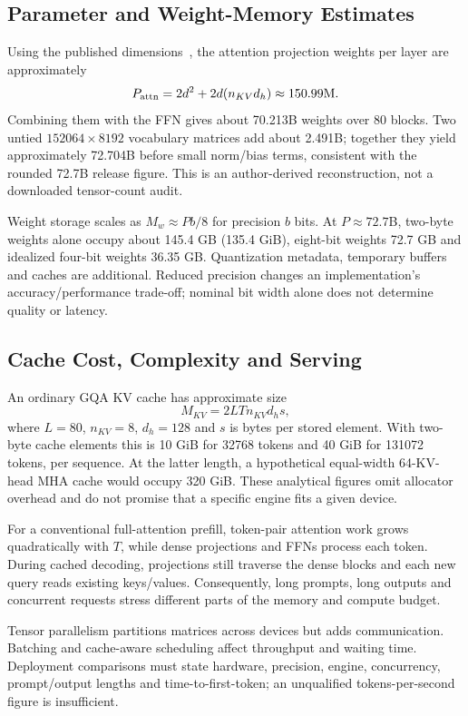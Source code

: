 \documentclass[conference]{IEEEtran}
\begin{document}
\subsection{Parameter and Weight-Memory Estimates}
Using the published dimensions~\cite{config}, the attention projection weights per layer are approximately
\begin{equation}
P_{\rm attn}=2d^2+2d(n_{KV}d_h)\approx150.99\text{M}.
\end{equation}
Combining them with the FFN gives about 70.213B weights over 80 blocks. Two untied $152064\times8192$ vocabulary matrices add about 2.491B; together they yield approximately 72.704B before small norm/bias terms, consistent with the rounded 72.7B release figure. This is an author-derived reconstruction, not a downloaded tensor-count audit.

Weight storage scales as $M_w\approx Pb/8$ for precision $b$ bits. At $P\approx72.7$B, two-byte weights alone occupy about 145.4 GB (135.4 GiB), eight-bit weights 72.7 GB and idealized four-bit weights 36.35 GB. Quantization metadata, temporary buffers and caches are additional. Reduced precision changes an implementation's accuracy/performance trade-off; nominal bit width alone does not determine quality or latency.

\subsection{Cache Cost, Complexity and Serving}
An ordinary GQA KV cache has approximate size
\begin{equation}
M_{KV}=2LTn_{KV}d_hs,
\end{equation}
where $L=80$, $n_{KV}=8$, $d_h=128$ and $s$ is bytes per stored element. With two-byte cache elements this is 10 GiB for 32768 tokens and 40 GiB for 131072 tokens, per sequence. At the latter length, a hypothetical equal-width 64-KV-head MHA cache would occupy 320 GiB. These analytical figures omit allocator overhead and do not promise that a specific engine fits a given device.

For a conventional full-attention prefill, token-pair attention work grows quadratically with $T$, while dense projections and FFNs process each token. During cached decoding, projections still traverse the dense blocks and each new query reads existing keys/values. Consequently, long prompts, long outputs and concurrent requests stress different parts of the memory and compute budget.

Tensor parallelism partitions matrices across devices but adds communication. Batching and cache-aware scheduling affect throughput and waiting time. Deployment comparisons must state hardware, precision, engine, concurrency, prompt/output lengths and time-to-first-token; an unqualified tokens-per-second figure is insufficient.
\end{document}
